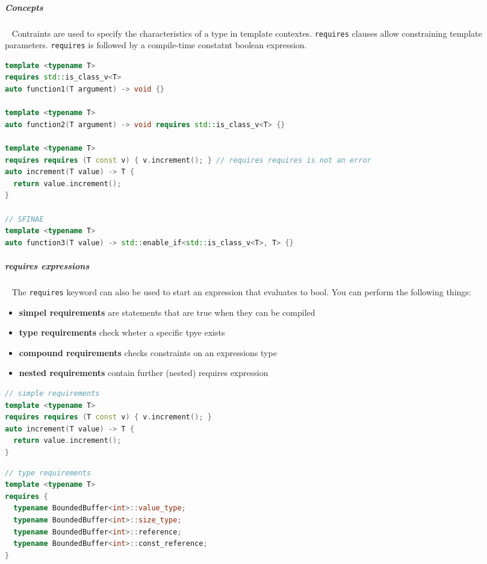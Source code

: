 \documentclass[11pt,twoside,landscape]{article}
\begin{document}
\begin{multicols}{2}
\subparagraph{Concepts} \
\label{sec:org293c757}
Contraints are used to specify the characteristics of a type in template contextes.
\texttt{requires} clauses allow constraining template parameters.
\texttt{requires} is followed by a compile-time constatnt boolean expression.

\begin{lstlisting}[language=c++,label=lst:org4abb784,caption={constraints vs SFINAE},captionpos=b,numbers=none]
template <typename T>
requires std::is_class_v<T>
auto function1(T argument) -> void {}

template <typename T>
auto function2(T argument) -> void requires std::is_class_v<T> {}

template <typename T>
requires requires (T const v) { v.increment(); } // requires requires is not an error
auto increment(T value) -> T {
  return value.increment();
}

// SFINAE
template <typename T>
auto function3(T value) -> std::enable_if<std::is_class_v<T>, T> {}
\end{lstlisting}

\subparagraph{requires expressions} \
\label{sec:org7f7f1b4}
The \texttt{requires} keyword can also be used to start an expression that evaluates to bool.
You can perform the following things:
\begin{itemize}
\item \textbf{simpel requirements} are statements that are true when they can be compiled
\item \textbf{type requirements} check wheter a specific tpye exists
\item \textbf{compound requirements} checks constraints on an expressions type
\item \textbf{nested requirements} contain further (nested) requires expression
\end{itemize}


\begin{lstlisting}[language=c++,label=lst:org2eb2300,caption={simple requirements example},captionpos=b,numbers=none]
// simple requirements
template <typename T>
requires requires (T const v) { v.increment(); }
auto increment(T value) -> T {
  return value.increment();
}
\end{lstlisting}

\begin{lstlisting}[language=c++,label=lst:org2a49baf,caption={type requirements example},captionpos=b,numbers=none]
// type requirements
template <typename T>
requires {
  typename BoundedBuffer<int>::value_type;
  typename BoundedBuffer<int>::size_type;
  typename BoundedBuffer<int>::reference;
  typename BoundedBuffer<int>::const_reference;
}
\end{lstlisting}


\end{multicols}
\end{document}
